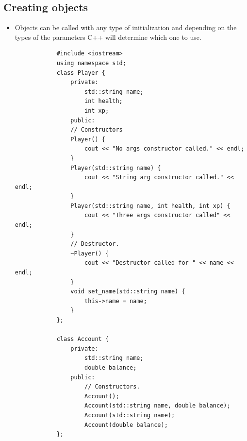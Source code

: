 \subsection{Creating objects}
\begin{itemize}
    \item Objects can be called with any type of initialization and depending on the types of the parameters C++ will determine which one to use.
        \begin{verbatim}
            #include <iostream>
            using namespace std;
            class Player {
                private:
                    std::string name;
                    int health;
                    int xp;
                public:
                // Constructors
                Player() {
                    cout << "No args constructor called." << endl;
                }
                Player(std::string name) {
                    cout << "String arg constructor called." << endl;
                }
                Player(std::string name, int health, int xp) {
                    cout << "Three args constructor called" << endl;
                }
                // Destructor.
                ~Player() {
                    cout << "Destructor called for " << name << endl;
                }
                void set_name(std::string name) {
                    this->name = name;
                }
            };

            class Account {
                private:
                    std::string name;
                    double balance;
                public: 
                    // Constructors.
                    Account();
                    Account(std::string name, double balance);
                    Account(std::string name);
                    Account(double balance);
            };


\end{verbatim}
\end{itemize}
